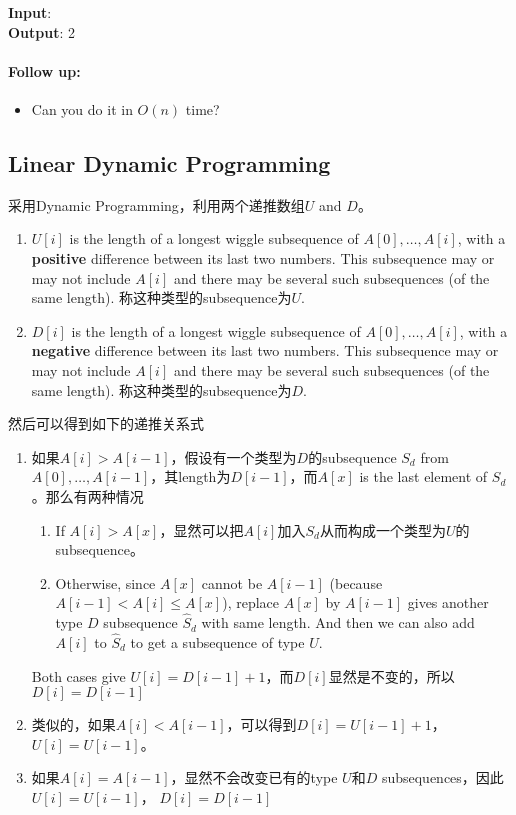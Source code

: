 \begin{flushleft}
\textbf{Input}: \fcj{[1,2,3,4,5,6,7,8,9]}
\\
\textbf{Output}: 2
\end{flushleft}

\paragraph{Follow up:}
\begin{itemize}
\item Can you do it in $ O(n) $ time?
\end{itemize}

\subsection{Linear Dynamic Programming}
采用Dynamic Programming，利用两个递推数组$U$ and $D$。
\begin{enumerate}
\item $U[i]$ is the length of a longest wiggle subsequence of $A[0],\ldots,A[i]$, with a \textbf{positive} difference between its last two numbers. This subsequence may or may not include $A[i]$ and there may be several such subsequences (of the same length). 称这种类型的subsequence为$U$.
\item $D[i]$ is the length of a longest wiggle subsequence of $A[0],\ldots,A[i]$, with a \textbf{negative} difference between its last two numbers. This subsequence may or may not include $A[i]$ and there may be several such subsequences (of the same length). 称这种类型的subsequence为$D$.
\end{enumerate}
然后可以得到如下的递推关系式
\begin{enumerate}
\item 如果$A[i]>A[i-1]$，假设有一个类型为$D$的subsequence $S_d$ from $A[0],\ldots,A[i-1]$，其length为$D[i-1]$，而$A[x]$ is the last element of $S_d$。那么有两种情况
\begin{enumerate}
\item If $A[i] > A[x]$，显然可以把$A[i]$加入$S_d$从而构成一个类型为$U$的subsequence。
\item Otherwise, since $A[x]$ cannot be $A[i-1]$ (because $A[i-1] < A[i]\leq A[x]$), replace $A[x]$ by $A[i-1]$ gives another type $D$ subsequence $\hat{S}_d$ with same length. And then we can also add $A[i]$ to $\hat{S}_d$ to get a subsequence of type $U$.
\end{enumerate}
Both cases give $U[i]=D[i-1]+1$，而$D[i]$显然是不变的，所以$D[i] = D[i-1]$
\item 类似的，如果$A[i] < A[i-1]$，可以得到$D[i] = U[i-1]+1$，$U[i]=U[i-1]$。
\item 如果$A[i]=A[i-1]$，显然不会改变已有的type $U$和$D$ subsequences，因此$U[i]=U[i-1]$， $D[i]=D[i-1]$
\end{enumerate}

